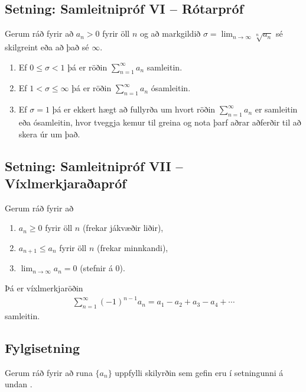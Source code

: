 \documentclass[a4paper,10pt,icelandic]{sphinxmanual}
\begin{document}
\subsection{Setning: Samleitnipróf VI – Rótarpróf}
\label{kafli09:setning-samleitniprof-vi-rotarprof}
Gerum ráð fyrir að \(a_n>0\) fyrir öll \(n\) og að markgildið
\(\sigma=\lim_{n\rightarrow\infty}\sqrt[n]{a_n}\) sé skilgreint eða
að það sé \(\infty\).
\begin{enumerate}
\item {} 
Ef \(0\leq\sigma<1\) þá er röðin \(\sum_{n=1}^\infty a_n\)
samleitin.

\item {} 
Ef \(1<\sigma\leq \infty\) þá er röðin
\(\sum_{n=1}^\infty a_n\) ósamleitin.

\item {} 
Ef \(\sigma=1\) þá er ekkert hægt að fullyrða um hvort röðin
\(\sum_{n=1}^\infty a_n\) er samleitin eða ósamleitin, hvor
tveggja kemur til greina og nota þarf aðrar aðferðir til að skera
úr um það.

\end{enumerate}


\subsection{Setning: Samleitnipróf VII – Víxlmerkjaraðapróf}
\label{kafli09:setning-samleitniprof-vii-vixlmerkjaraaprof}\label{kafli09:vixlmerkjaprof}
Gerum ráð fyrir að
\begin{enumerate}
\item {} 
\(a_n\geq 0\) fyrir öll \(n\) (frekar jákvæðir liðir),

\item {} 
\(a_{n+1}\leq a_n\) fyrir öll \(n\) (frekar minnkandi),

\item {} 
\(\lim_{n\rightarrow\infty} a_n=0\) (stefnir á 0).

\end{enumerate}

Þá er víxlmerkjaröðin
\begin{equation*}
\begin{split}\sum_{n=1}^\infty (-1)^{n-1}a_n=a_1-a_2+a_3-a_4+\cdots\end{split}
\end{equation*}
samleitin.


\subsection{Fylgisetning}
\label{kafli09:id11}
Gerum ráð fyrir að runa \(\{a_n\}\) uppfylli skilyrðin sem gefin eru
í setningunni á undan {\hyperref[kafli09:vixlmerkjaprof]{}}.
\end{document}
